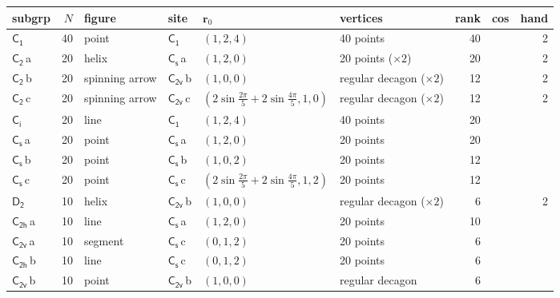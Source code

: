\documentclass[10pt,a4paper]{article}
\numberwithin{equation}{section}
\newcommand{\grp}[1]{\mathsf{#1}}
\newcommand{\clsletter}[1]{\,{\scriptsize\color{black!55}#1}}
\newcommand{\pointr}{\mathbf{r}}
\newlength{\fillwidth}\newlength{\cellwidth}\newlength{\colwidth}
\begin{document}
{{\begin{longtable}{@{}lrllllr>{\RaggedRight\arraybackslash}p{\fillwidth}r@{}}
subgrp & $N$ & figure & site & $\pointr_0$ & vertices & rank & cos & hand\\\midrule\endhead
\bottomrule\endfoot\endlastfoot
\href{C1.pdf}{$\grp{C_{1}}$} & 40 & point & \href{C1.pdf}{$\grp{C_{1}}$} & $(1, 2, 4)$ & 40 points & 40 &  & 2\\*
\href{C2.pdf}{$\grp{C_{2}}$}\clsletter{a} & 20 & helix & \href{C1v.pdf}{$\grp{C_{s}}$}\clsletter{a} & $(1, 2, 0)$ & 20 points (${\times}2$) & 20 &  & 2\\
\href{C2.pdf}{$\grp{C_{2}}$}\clsletter{b} & 20 & spinning arrow & \href{C2v.pdf}{$\grp{C_{2v}}$}\clsletter{b} & $(1, 0, 0)$ & regular decagon (${\times}2$) & 12 &  & 2\\
\href{C2.pdf}{$\grp{C_{2}}$}\clsletter{c} & 20 & spinning arrow & \href{C2v.pdf}{$\grp{C_{2v}}$}\clsletter{c} & $(2\sin\tfrac{2\pi}{5} + 2\sin\tfrac{4\pi}{5}, 1, 0)$ & regular decagon (${\times}2$) & 12 &  & 2\\
\href{S2.pdf}{$\grp{C_{i}}$} & 20 & line & \href{C1.pdf}{$\grp{C_{1}}$} & $(1, 2, 4)$ & 40 points & 20 &  & \\
\href{C1v.pdf}{$\grp{C_{s}}$}\clsletter{a} & 20 & point & \href{C1v.pdf}{$\grp{C_{s}}$}\clsletter{a} & $(1, 2, 0)$ & 20 points & 20 &  & \\
\href{C1v.pdf}{$\grp{C_{s}}$}\clsletter{b} & 20 & point & \href{C1v.pdf}{$\grp{C_{s}}$}\clsletter{b} & $(1, 0, 2)$ & 20 points & 12 &  & \\
\href{C1v.pdf}{$\grp{C_{s}}$}\clsletter{c} & 20 & point & \href{C1v.pdf}{$\grp{C_{s}}$}\clsletter{c} & $(2\sin\tfrac{2\pi}{5} + 2\sin\tfrac{4\pi}{5}, 1, 2)$ & 20 points & 12 &  & \\
\href{D2.pdf}{$\grp{D_{2}}$} & 10 & helix & \href{C2v.pdf}{$\grp{C_{2v}}$}\clsletter{b} & $(1, 0, 0)$ & regular decagon (${\times}2$) & 6 &  & 2\\
\href{C2h.pdf}{$\grp{C_{2h}}$}\clsletter{a} & 10 & line & \href{C1v.pdf}{$\grp{C_{s}}$}\clsletter{a} & $(1, 2, 0)$ & 20 points & 10 &  & \\
\href{C2v.pdf}{$\grp{C_{2v}}$}\clsletter{a} & 10 & segment & \href{C1v.pdf}{$\grp{C_{s}}$}\clsletter{c} & $(0, 1, 2)$ & 20 points & 6 &  & \\
\href{C2h.pdf}{$\grp{C_{2h}}$}\clsletter{b} & 10 & line & \href{C1v.pdf}{$\grp{C_{s}}$}\clsletter{c} & $(0, 1, 2)$ & 20 points & 6 &  & \\
\href{C2v.pdf}{$\grp{C_{2v}}$}\clsletter{b} & 10 & point & \href{C2v.pdf}{$\grp{C_{2v}}$}\clsletter{b} & $(1, 0, 0)$ & regular decagon & 6 &  & \\

\end{longtable}}}
\end{document}

